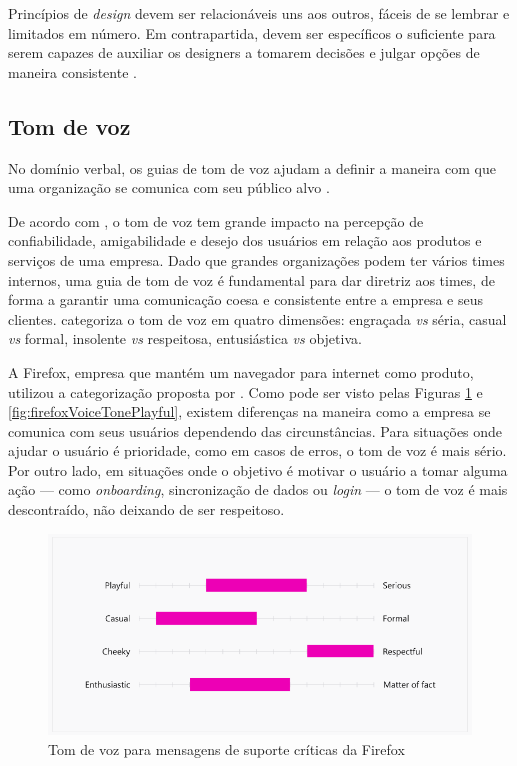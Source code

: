 Princípios de \textit{design} devem ser relacionáveis uns aos outros, fáceis de se lembrar e limitados em número. Em contrapartida, devem ser específicos o suficiente para serem capazes de auxiliar os designers a tomarem decisões e julgar opções de maneira consistente \cite{kholmatova2017design}.

\subsection{Tom de voz}
\label{subsec:tomVoz}

No domínio verbal, os guias de tom de voz ajudam a definir a maneira com que uma organização se comunica com seu público alvo \cite{ruissalo2018operating}.

De acordo com , o tom de voz tem grande impacto na percepção de confiabilidade, amigabilidade e desejo dos usuários em relação aos produtos e serviços de uma empresa. Dado que grandes organizações podem ter vários times internos, uma guia de tom de voz é fundamental para dar diretriz aos times, de forma a garantir uma comunicação coesa e consistente entre a empresa e seus clientes.  categoriza o tom de voz em quatro dimensões: engraçada \textit{vs} séria, casual \textit{vs} formal, insolente \textit{vs} respeitosa, entusiástica \textit{vs} objetiva.

A Firefox, empresa que mantém um navegador para internet como produto, utilizou a categorização proposta por \cite{impactOfVoiceTone}. Como pode ser visto pelas Figuras \ref{fig:firefoxVoiceToneSerious} e \ref{fig:firefoxVoiceTonePlayful}, existem diferenças na maneira como a empresa se comunica com seus usuários dependendo das circunstâncias. Para situações onde ajudar o usuário é prioridade, como em casos de erros, o tom de voz é mais sério. Por outro lado, em situações onde o objetivo é motivar o usuário a tomar alguma ação --- como \textit{onboarding}, sincronização de dados ou \textit{login} --- o tom de voz é mais descontraído, não deixando de ser respeitoso.

\begin{figure}
	\includegraphics[width=\linewidth]{./04-figuras/02_referencial_teorico/firefox-tone-voice-01.png}
	\caption{Tom de voz para mensagens de suporte críticas da Firefox}
  \label{fig:firefoxVoiceToneSerious}
\end{figure}

